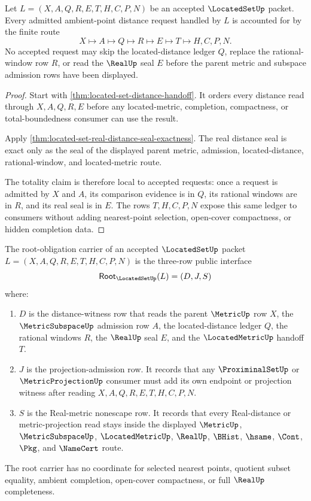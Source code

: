 \begin{theorem}
\label{thm:located-set-distance-ledger-totality}
Let $L=(X,A,Q,R,E,T,H,C,P,N)$ be an accepted $\LocatedSetUp$ packet. Every admitted ambient-point distance request handled by $L$ is accounted for by the finite route
$$
X\longmapsto A\longmapsto Q\longmapsto R\longmapsto E\longmapsto T\longmapsto H,C,P,N .
$$
No accepted request may skip the located-distance ledger $Q$, replace the rational-window row $R$, or read the $\RealUp$ seal $E$ before the parent metric and subspace admission rows have been displayed.
\end{theorem}
\begin{proof}
Start with \autoref{thm:located-set-distance-handoff}. It orders every distance read through $X,A,Q,R,E$ before any located-metric, completion, compactness, or total-boundedness consumer can use the result.

Apply \autoref{thm:located-set-real-distance-seal-exactness}. The real distance seal is exact only as the seal of the displayed parent metric, admission, located-distance, rational-window, and located-metric route.

The totality claim is therefore local to accepted requests: once a request is admitted by $X$ and $A$, its comparison evidence is in $Q$, its rational windows are in $R$, and its real seal is in $E$. The rows $T,H,C,P,N$ expose this same ledger to consumers without adding nearest-point selection, open-cover compactness, or hidden completion data.
\end{proof}

\begin{definition}
\label{def:located-set-root-carrier}
The root-obligation carrier of an accepted $\LocatedSetUp$ packet $L=(X,A,Q,R,E,T,H,C,P,N)$ is the three-row public interface
$$
\mathsf{Root}_{\LocatedSetUp}(L)=(D,J,S)
$$
where:
\begin{enumerate}
\item $D$ is the distance-witness row that reads the parent $\MetricUp$ row $X$, the $\MetricSubspaceUp$ admission row $A$, the located-distance ledger $Q$, the rational windows $R$, the $\RealUp$ seal $E$, and the $\LocatedMetricUp$ handoff $T$.
\item $J$ is the projection-admission row. It records that any $\ProximinalSetUp$ or $\MetricProjectionUp$ consumer must add its own endpoint or projection witness after reading $X,A,Q,R,E,T,H,C,P,N$.
\item $S$ is the Real-metric nonescape row. It records that every Real-distance or metric-projection read stays inside the displayed $\MetricUp$, $\MetricSubspaceUp$, $\LocatedMetricUp$, $\RealUp$, $\BHist$, $\hsame$, $\Cont$, $\Pkg$, and $\NameCert$ route.
\end{enumerate}
The root carrier has no coordinate for selected nearest points, quotient subset equality, ambient completion, open-cover compactness, or full $\RealUp$ completeness.
\end{definition}

